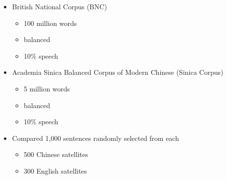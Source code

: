 \documentclass[a4paper,landscape,headrule,footrule,xetex]{foils}
\begin{document}
\MyLogo{}
\begin{itemize}
\item British National Corpus (BNC)
  \begin{itemize}
  \item 100 million words
  \item balanced
  \item 10\% speech
  \end{itemize}
\item Academia Sinica Balanced Corpus of Modern Chinese (Sinica Corpus) 
  \begin{itemize}
  \item 5 million words
  \item balanced
  \item 10\% speech
  \end{itemize}
\item Compared 1,000 sentences randomly selected from each
  \begin{itemize}
  \item 500 Chinese satellites
  \item 300 English satellites
  \end{itemize}
\end{itemize}

\end{document}
